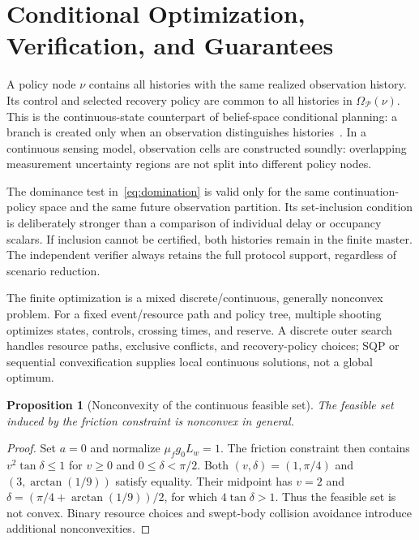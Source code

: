 \documentclass[letterpaper]{article} %
\newtheorem{proposition}{Proposition}
\begin{document}
\section{Conditional Optimization, Verification, and Guarantees}
\label{app:verification}
A policy node $\nu$ contains all histories with the same realized
observation history. Its control and selected recovery policy are common to
all histories in $\Omega_{\mathcal P}(\nu)$. This is the continuous-state
counterpart of belief-space conditional planning: a branch is created only
when an observation distinguishes histories~\citep{kaelbling1998planning,
rintanen2005conditional}. In a continuous sensing model, observation cells
are constructed soundly: overlapping measurement uncertainty regions are
not split into different policy nodes.

The dominance test in~\eqref{eq:domination} is valid only for the same
continuation-policy space and the same future observation partition. Its
set-inclusion condition is deliberately stronger than a comparison of
individual delay or occupancy scalars. If inclusion cannot be certified, both
histories remain in the finite master. The independent verifier always
retains the full protocol support, regardless of scenario reduction.

The finite optimization is a mixed discrete/continuous, generally nonconvex
problem. For a fixed event/resource path and policy tree, multiple shooting
optimizes states, controls, crossing times, and reserve. A discrete outer
search handles resource paths, exclusive conflicts, and recovery-policy
choices; SQP or sequential convexification supplies local continuous
solutions, not a global optimum.
\begin{proposition}[Nonconvexity of the continuous feasible set]
The feasible set induced by the friction constraint is nonconvex in general.
\end{proposition}
\begin{proof}
Set $a=0$ and normalize $\mu_f g_0L_w=1$. The friction constraint then
contains $v^2\tan\delta\leq1$ for $v\geq0$ and
$0\leq\delta<\pi/2$. Both $(v,\delta)=(1,\pi/4)$ and
$(3,\arctan(1/9))$ satisfy equality. Their midpoint has $v=2$ and
$\delta=(\pi/4+\arctan(1/9))/2$, for which
$4\tan\delta>1$. Thus the feasible set is not convex. Binary resource
choices and swept-body collision avoidance introduce additional
nonconvexities.
\end{proof}
\end{document}
